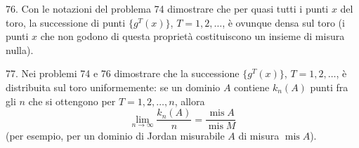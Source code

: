 \begin{problem}{76.}
	Con le notazioni del problema 74 dimostrare che per quasi tutti i punti $x$ del toro, la successione di punti  $\{g^T (x)\}$, $T=1, 2, \dotsc$, è ovunque densa sul toro 
	(i punti $x$ che non godono di questa proprietà costituiscono un insieme di misura nulla).
\end{problem}

\begin{problem}{77.}
	Nei problemi 74 e 76 dimostrare che la successione  $\{g^T (x)\}$, $T=1, 2, \dotsc$, è distribuita sul toro uniformemente: se un dominio $A$ contiene $k_n(A)$ punti fra gli $n$ che si ottengono per $T=1, 2, \dotsc,n$, allora
	\begin{equation*}
		\lim_{n \to \infty} \frac{k_n(A)}{n}=\frac{\operatorname{mis} A}{\operatorname{mis} M}
	\end{equation*}
	(per esempio, per un dominio di Jordan misurabile $A$ di misura $\operatorname{mis} A$).
\end{problem}

